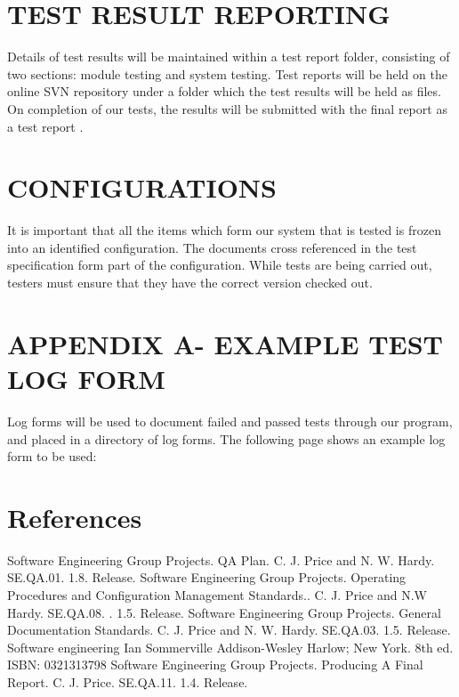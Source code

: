 \documentclass[a4paper]{article}
\begin{document}
\clearpage

\section{TEST RESULT REPORTING}
Details of test results will be maintained within a test report folder, consisting of two sections: module testing and system testing. Test reports will be held on the online SVN repository under a folder which the test results will be held as files. On completion of our tests, the results will be submitted with the final report as a test report \cite{Software Engineering Group Projects. Producing A Final Report.}.

\section{CONFIGURATIONS}
It is important that all the items which form our system that is tested is frozen into an identified configuration. The documents cross referenced in the test specification form part of the configuration. While tests are being carried out, testers must ensure that they have the correct version checked out.

\clearpage

\section{APPENDIX A- EXAMPLE TEST LOG FORM}
Log forms will be used to document failed and passed tests through our program, and placed in a directory of log forms. The following page shows an example log form to be used:


\clearpage

\section{References}
\begin{thebibliography}{9}
 Software Engineering Group Projects. QA Plan. C. J. Price and N. W. Hardy. SE.QA.01. 1.8. Release.
 Software Engineering Group Projects. Operating Procedures and Configuration Management Standards.. C. J. Price and N.W Hardy. SE.QA.08. . 1.5. Release.
Software Engineering Group Projects. General Documentation Standards. C. J. Price and N. W. Hardy.
SE.QA.03. 1.5. Release.
Software engineering Ian Sommerville Addison-Wesley Harlow; New York. 8th ed. ISBN: 0321313798
Software Engineering Group Projects. Producing A Final Report. C. J. Price. SE.QA.11. 1.4. Release.
\end{thebibliography}
\end{document}
